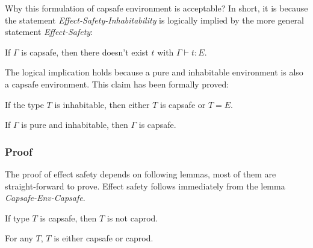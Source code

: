 
Why this formulation of capsafe environment is acceptable? In short,
it is because the statement \emph{Effect-Safety-Inhabitability} is
logically implied by the more general statement \emph{Effect-Safety}:

\begin{definition}
  If $\Gamma$ is capsafe, then there doesn't exist $t$ with
  $\Gamma \vdash t : E$.
\end{definition}

The logical implication holds because a pure and inhabitable
environment is also a capsafe environment. This claim has been
formally proved:

\begin{lemma}
  If the type $T$ is inhabitable, then either $T$ is capsafe or $T = E$.
\end{lemma}

\begin{theorem}
  If $\Gamma$ is pure and inhabitable, then $\Gamma$ is capsafe.
\end{theorem}


\subsubsection{Proof}

The proof of effect safety depends on following lemmas, most of them
are straight-forward to prove. Effect safety follows immediately from
the lemma \emph{Capsafe-Env-Capsafe}.


\begin{lemma}
 If type $T$ is capsafe, then $T$ is not caprod.
\end{lemma}

\begin{lemma}
 For any $T$, $T$ is either capsafe or caprod.
\end{lemma}

